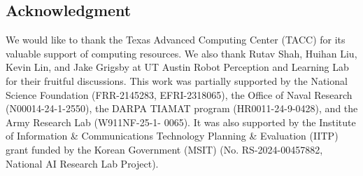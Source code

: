 \subsection*{Acknowledgment}
We would like to thank the Texas Advanced Computing Center (TACC) for its valuable support of computing resources. We also thank Rutav Shah, Huihan Liu, Kevin Lin, and Jake Grigsby at UT Austin Robot Perception and Learning Lab for their fruitful discussions.
This work was partially supported by the National Science Foundation (FRR-2145283, EFRI-2318065), the Office of Naval Research (N00014-24-1-2550), the DARPA TIAMAT program (HR0011-24-9-0428), and the Army Research Lab (W911NF-25-1- 0065). It was also supported by the Institute of Information \& Communications Technology Planning \& Evaluation (IITP) grant funded by the Korean Government (MSIT) (No. RS-2024-00457882, National AI Research Lab Project).
